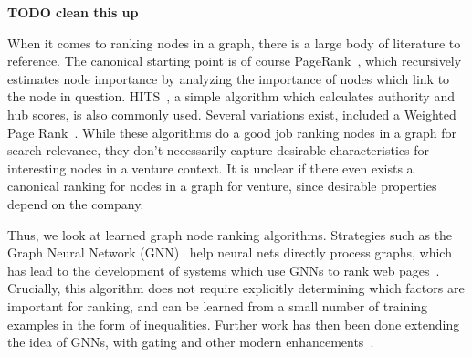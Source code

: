 \textbf{TODO clean this up}

When it comes to ranking nodes in a graph, there is a large body of literature to reference. The canonical starting point is of course PageRank~\cite{page1999pagerank}, which recursively estimates node importance by analyzing the importance of nodes which link to the node in question. HITS~\cite{kleinberg1999authoritative}, a simple algorithm which calculates authority and hub scores, is also commonly used. Several variations exist, included a Weighted Page Rank~\cite{xing2004weighted}. While these algorithms do a good job ranking nodes in a graph for search relevance, they don't necessarily capture desirable characteristics for interesting nodes in a venture context. It is unclear if there even exists a canonical ranking for nodes in a graph for venture, since desirable properties depend on the company.

Thus, we look at learned graph node ranking algorithms. Strategies such as the Graph Neural Network (GNN)~\cite{scarselli2009graph} help neural nets directly process graphs, which has lead to the development of systems which use GNNs to rank web pages~\cite{scarselli2005graph}. Crucially, this algorithm does not require explicitly determining which factors are important for ranking, and can be learned from a small number of training examples in the form of inequalities. Further work has then been done extending the idea of GNNs, with gating and other modern enhancements~\cite{DBLP:journals/corr/LiTBZ15}.
